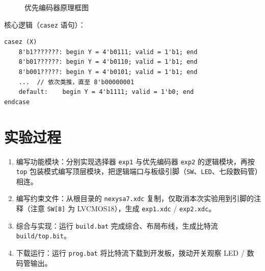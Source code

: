 \documentclass[12pt, a4paper]{ctexart}
\begin{document}
\begin{figure}[htbp]
    \centering
    \caption{优先编码器原理框图}
\end{figure}

核心逻辑（\texttt{casez} 语句）：
\begin{lstlisting}
casez (X)
    8'b1???????: begin Y = 4'b0111; valid = 1'b1; end
    8'b01??????: begin Y = 4'b0110; valid = 1'b1; end
    8'b001?????: begin Y = 4'b0101; valid = 1'b1; end
    ...  // 依次类推，直至 8'b00000001
    default:    begin Y = 4'b1111; valid = 1'b0; end
endcase
\end{lstlisting}

\section{实验过程}
\begin{enumerate}
    \item 编写功能模块：分别实现选择器 \texttt{exp1} 与优先编码器 \texttt{exp2} 的逻辑模块，再按 \texttt{top} 包装模式编写顶层模块，把逻辑端口与板级引脚（\texttt{SW}、\texttt{LED}、七段数码管）相连。
    \item 编写约束文件：从根目录的 \texttt{nexysa7.xdc} 复制，仅取消本次实验用到引脚的注释（注意 \texttt{SW[8]} 为 LVCMOS18），生成 \texttt{exp1.xdc} / \texttt{exp2.xdc}。
    \item 综合与实现：运行 \texttt{build.bat} 完成综合、布局布线，生成比特流 \texttt{build/top.bit}。
    \item 下载运行：运行 \texttt{prog.bat} 将比特流下载到开发板，拨动开关观察 LED / 数码管输出。
\end{enumerate}
\end{document}

